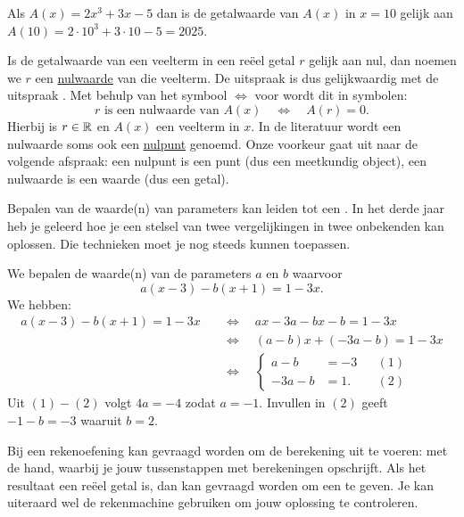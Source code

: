 \documentclass{ximera}
\begin{document}
\begin{example}
Als $A(x) = 2x^3+3x-5$ dan is de getalwaarde van $A(x)$ in $x = 10$ gelijk aan $A(10) = 2\cdot 10^3 + 3 \cdot 10 - 5 = 2025$.
\end{example}

Is de getalwaarde van een veelterm in een re\"eel getal $r$ gelijk aan nul, dan noemen we $r$ een \underline{nulwaarde}  van die veelterm. De uitspraak  is dus gelijkwaardig met de uitspraak . Met behulp van het symbool $\Leftrightarrow$ voor  wordt dit in symbolen:
\[
r \text{ is een nulwaarde van } A(x) \quad \Leftrightarrow \quad A(r) = 0.
\]
Hierbij is $r \in \mathbb{R}$ en $A(x)$ een veelterm in $x$. In de literatuur wordt een nulwaarde soms ook een \underline{nulpunt} genoemd. Onze voorkeur gaat uit naar de volgende afspraak: een nulpunt is een punt (dus een meetkundig object), een nulwaarde is een waarde (dus een getal).

Bepalen van de waarde(n) van parameters kan leiden tot een . 
In het derde jaar heb je geleerd hoe je een stelsel van twee vergelijkingen in twee onbekenden kan oplossen. Die technieken moet je nog steeds kunnen toepassen. 

\begin{example}
We bepalen de waarde(n) van de parameters $a$ en $b$ waarvoor
\[
a(x-3) - b(x+1) = 1-3x.
\]
We hebben:
\begin{align*}
a(x-3) - b(x+1) = 1-3x \quad 
& \Leftrightarrow \quad ax-3a-bx-b=1-3x \\
& \Leftrightarrow \quad (a-b)x +(-3a-b) = 1-3x \\
& \Leftrightarrow \quad
\left\{
\begin{aligned}
a - b & = -3 && (1)\\
-3a - b & = 1. && (2)
\end{aligned}
\right.
\end{align*}
Uit $(1)-(2)$ volgt $4a = -4$ zodat $a = -1$. Invullen in $(2)$ geeft $-1-b =  -3$ waaruit $b = 2$. 
\end{example}

Bij een rekenoefening kan gevraagd worden om de berekening  uit te voeren: met de hand, waarbij je jouw tussenstappen met berekeningen opschrijft. Als het resultaat een re\"eel getal is, dan kan gevraagd worden om een  te geven. Je kan uiteraard wel de rekenmachine gebruiken om jouw oplossing te controleren. 
\end{document}
